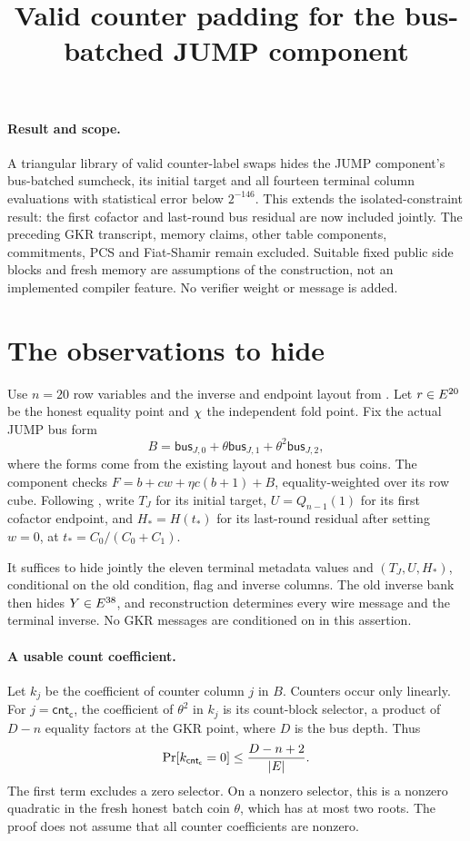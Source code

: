 \documentclass[11pt]{article}
\title{Valid counter padding for the bus-batched JUMP component}
\author{}
\date{}
\begin{document}
\maketitle
\vspace{-2em}

\paragraph{Result and scope.} A triangular library of valid counter-label swaps hides the JUMP component's bus-batched sumcheck, its initial target and all fourteen terminal column evaluations with statistical error below $2^{-146}$. This extends the isolated-constraint result: the first cofactor and last-round bus residual are now included jointly. The preceding GKR transcript, memory claims, other table components, commitments, PCS and Fiat-Shamir remain excluded. Suitable fixed public side blocks and fresh memory are assumptions of the construction, not an implemented compiler feature. No verifier weight or message is added.

\section{The observations to hide}

Use $n=20$ row variables and the inverse and endpoint layout from . Let $r\in E^{20}$ be the honest equality point and $\chi$ the independent fold point. Fix the actual JUMP bus form
\[
 B=\mathsf{bus}_{J,0}+\theta\mathsf{bus}_{J,1}
       +\theta^2\mathsf{bus}_{J,2},
\]
where the forms come from the existing layout and honest bus coins. The component checks $F=b+cw+\eta c(b+1)+B$, equality-weighted over its row cube. Following , write $T_J$ for its initial target, $U=Q_{n-1}(1)$ for its first cofactor endpoint, and $H_*=H(t_*)$ for its last-round residual after setting $w=0$, at $t_*=C_0/(C_0+C_1)$.

It suffices to hide jointly the eleven terminal metadata values and $(T_J,U,H_*)$, conditional on the old condition, flag and inverse columns. The old inverse bank then hides $Y\in E^{38}$, and reconstruction determines every wire message and the terminal inverse. No GKR messages are conditioned on in this assertion.

\paragraph{A usable count coefficient.} Let $k_j$ be the coefficient of counter column $j$ in $B$. Counters occur only linearly. For $j=\mathsf{cnt_c}$, the coefficient of $\theta^2$ in $k_j$ is its count-block selector, a product of $D-n$ equality factors at the GKR point, where $D$ is the bus depth. Thus
\[
 \Pr[k_{\mathsf{cnt_c}}=0]\le\frac{D-n+2}{|E|}.
\]
The first term excludes a zero selector. On a nonzero selector, this is a nonzero quadratic in the fresh honest batch coin $\theta$, which has at most two roots. The proof does not assume that all counter coefficients are nonzero.
\end{document}
